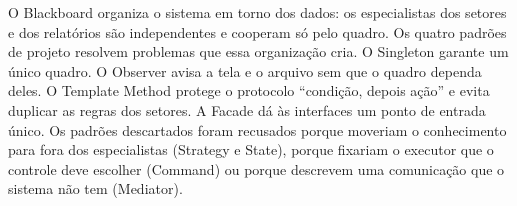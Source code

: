 O Blackboard organiza o sistema em torno dos dados: os especialistas dos setores e dos relatórios são independentes e cooperam só pelo quadro. Os quatro padrões de projeto resolvem problemas que essa organização cria. O Singleton garante um único quadro. O Observer avisa a tela e o arquivo sem que o quadro dependa deles. O Template Method protege o protocolo ``condição, depois ação'' e evita duplicar as regras dos setores. A Facade dá às interfaces um ponto de entrada único. Os padrões descartados foram recusados porque moveriam o conhecimento para fora dos especialistas (Strategy e State), porque fixariam o executor que o controle deve escolher (Command) ou porque descrevem uma comunicação que o sistema não tem (Mediator).





